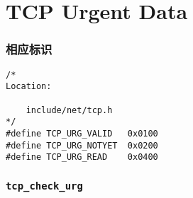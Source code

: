 \section{TCP Urgent Data}
        \subsubsection{相应标识}

\begin{verbatim}
/*
Location:

    include/net/tcp.h
*/
#define TCP_URG_VALID   0x0100
#define TCP_URG_NOTYET  0x0200
#define TCP_URG_READ    0x0400
\end{verbatim}
        \subsubsection{\texttt{tcp_check_urg}}
            \label{TCPUrgent:tcp_check_urg}

